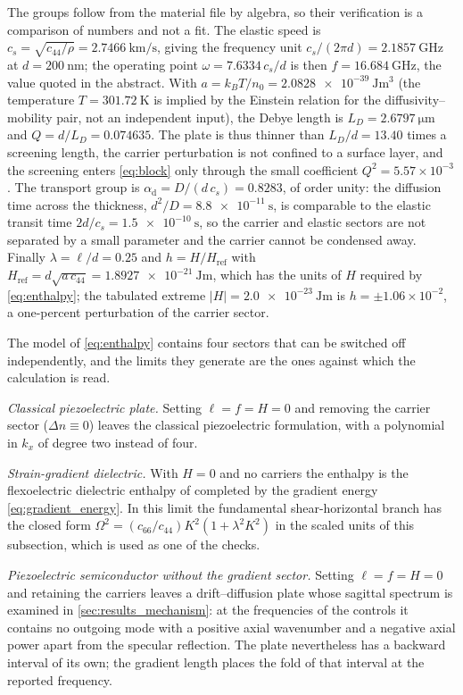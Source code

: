 The groups follow from the material file by algebra, so their verification is a comparison of numbers and not a fit.  The elastic speed is
$c_s=\sqrt{c_{44}/\rho}=\SI{2.7466}{\kilo\metre\per\second}$, giving the frequency unit
$c_s/(2\pi d)=\SI{2.1857}{\giga\hertz}$ at $d=\SI{200}{\nano\metre}$; the operating point
$\omega=7.6334\,c_s/d$ is then $f=\SI{16.684}{\giga\hertz}$, the value quoted in the abstract.
With $a=k_BT/n_0=\SI{2.0828e-39}{\joule\metre^{3}}$ (the temperature
$T=\SI{301.72}{\kelvin}$ is implied by the Einstein relation for the diffusivity--mobility
pair, not an independent input), the Debye length is
$L_D=\SI{2.6797}{\micro\metre}$ and $Q=d/L_D=0.074635$.  The plate is thus thinner than
$L_D/d=13.40$ times a screening length, the carrier perturbation is not confined to a
surface layer, and the screening enters \eqref{eq:block} only through the small coefficient
$Q^{2}=5.57\times10^{-3}$.  The transport group is
$\alpha_{\mathrm d}=D/(d\,c_s)=0.8283$, of order unity: the diffusion time across the
thickness, $d^{2}/D=\SI{8.8e-11}{\second}$, is comparable to the elastic transit time
$2d/c_s=\SI{1.5e-10}{\second}$, so the carrier and elastic sectors are not separated by a
small parameter and the carrier cannot be condensed away.  Finally $\lambda=\ell/d=0.25$
and $h=H/H_{\mathrm{ref}}$ with
$H_{\mathrm{ref}}=d\sqrt{a\,c_{44}}=\SI{1.8927e-21}{\joule\metre}$, which has the units of $H$
required by \eqref{eq:enthalpy}; the tabulated extreme $|H|=\SI{2.0e-23}{\joule\metre}$ is
$h=\pm1.06\times10^{-2}$, a one-percent perturbation of the carrier sector.

The model of \eqref{eq:enthalpy} contains four sectors that can be switched off
independently, and the limits they generate are the ones against which the
calculation is read.

\emph{Classical piezoelectric plate.}  Setting $\ell=f=H=0$ and removing the
carrier sector ($\Delta n\equiv0$) leaves the classical piezoelectric
formulation, with a polynomial in $k_x$ of degree two instead of four.

\emph{Strain-gradient dielectric.}  With $H=0$ and no carriers the enthalpy is
the flexoelectric dielectric enthalpy of \cite{shen2010theory} completed by the
gradient energy \eqref{eq:gradient_energy}.  In this limit the fundamental
shear-horizontal branch has the closed form
$\Omega^{2}=(c_{66}/c_{44})K^{2}(1+\lambda^{2}K^{2})$ in the scaled units of this subsection, which is used as one of the checks.

\emph{Piezoelectric semiconductor without the gradient sector.}  Setting
$\ell=f=H=0$ and retaining the carriers leaves a drift--diffusion plate whose
sagittal spectrum is examined in \cref{sec:results_mechanism}: at the frequencies of the controls it
contains no outgoing mode with a positive axial wavenumber and a negative axial
power apart from the specular reflection.  The plate nevertheless has a backward
interval of its own; the gradient length places the fold of that interval at the
reported frequency.

